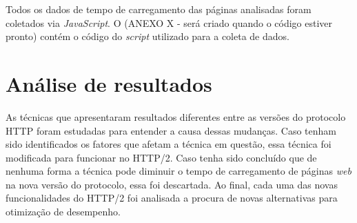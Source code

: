 Todos os dados de tempo de carregamento das páginas analisadas foram coletados via \textit{JavaScript}. O (ANEXO X - será criado quando o código estiver pronto) contém o código do \textit{script} utilizado para a coleta de dados.

\section{Análise de resultados}

As técnicas que apresentaram resultados diferentes entre as versões do protocolo HTTP foram estudadas para entender a causa dessas mudanças. Caso tenham sido identificados os fatores que afetam a técnica em questão, essa técnica foi modificada para funcionar no HTTP/2. Caso tenha sido concluído que de nenhuma forma a técnica pode diminuir o tempo de carregamento de páginas \textit{web} na nova versão do protocolo, essa foi descartada. Ao final, cada uma das novas funcionalidades do HTTP/2 foi analisada a procura de novas alternativas para otimização de desempenho.